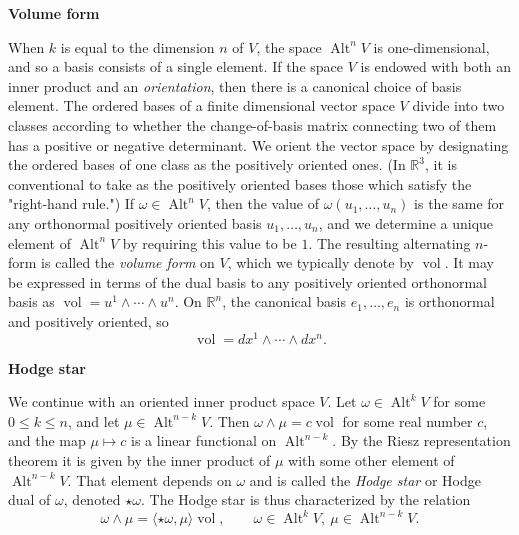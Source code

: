 \medskip\noindent\textbf{{Volume form}}\par
{When $k$ is equal to the dimension $n$ of $V$, the space $\operatorname{Alt}^nV$ is one-dimensional, and so a basis consists of a single element. If the space $V$ is endowed with both an inner product and an \emph{orientation}, then there is a canonical choice of basis element. The ordered bases of a finite dimensional vector space $V$ divide into two classes according to whether the change-of-basis matrix connecting two of them has a positive or negative determinant. We orient the vector space by designating the ordered bases of one class as the positively oriented ones. (In $\mathbb R^3$, it is conventional to take as the positively oriented bases those which satisfy the "right-hand rule.") If $\omega\in\operatorname{Alt}^nV$, then the value of $\omega(u_1,\ldots,u_n)$ is the same for any orthonormal positively oriented basis $u_1,\ldots,u_n$, and we determine a unique element of $\operatorname{Alt}^nV$ by requiring this value to be $1$. The resulting alternating $n$-form is called the \emph{volume form} on $V$, which we typically denote by $\operatorname{vol}$. It may be expressed in terms of the dual basis to any positively oriented orthonormal basis as $\operatorname{vol}=u^1\wedge\cdots\wedge u^n$. On $\mathbb R^n$, the canonical basis $e_1,\ldots,e_n$ is orthonormal and positively oriented, so}
\[
\operatorname{vol}=dx^1\wedge\cdots\wedge dx^n.
\]

\medskip\noindent\textbf{Hodge {star}}\par
{We continue with an oriented inner product space $V$. Let $\omega\in\operatorname{Alt}^kV$ for some $0\leq k\leq n$, and let $\mu\in\operatorname{Alt}^{n-k}V$. Then $\omega\wedge\mu=c\operatorname{vol}$ for some real number $c$, and the map $\mu\mapsto c$ is a linear functional on $\operatorname{Alt}^{n-k}$. By the Riesz representation theorem it is given by the inner product of $\mu$ with some other element of $\operatorname{Alt}^{n-k}V$. That element depends on $\omega$ and is called the \emph{Hodge star} or Hodge dual of $\omega$, denoted $\star\omega$. The Hodge star is thus characterized by the relation}
\begin{equation}\label{eq:hodge-star-characterization}
\omega\wedge\mu=\langle\star\omega,\mu\rangle\operatorname{vol},\qquad\omega\in\operatorname{Alt}^kV,\ \mu\in\operatorname{Alt}^{n-k}V.
\end{equation}

